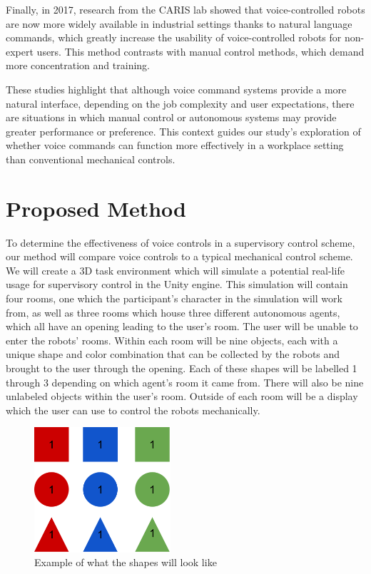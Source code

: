 \documentclass[conference]{IEEEtran}
\begin{document}
Finally, in 2017, research from the CARIS lab showed that voice-controlled robots are now more widely available in industrial settings thanks to natural language commands, which greatly increase the usability of voice-controlled robots for non-expert users. This method contrasts with manual control methods, which demand more concentration and training.  

These studies highlight that although voice command systems provide a more natural interface, depending on the job complexity and user expectations, there are situations in which manual control or autonomous systems may provide greater performance or preference. This context guides our study's exploration of whether voice commands can function more effectively in a workplace setting than conventional mechanical controls. 

\section{Proposed Method}
To determine the effectiveness of voice controls in a supervisory control scheme, our method will compare voice controls to a typical mechanical control scheme. We will create a 3D task environment which will simulate a potential real-life usage for supervisory control in the Unity engine. This simulation will contain four rooms, one which the participant’s character in the simulation will work from, as well as three rooms which house three different autonomous agents, which all have an opening leading to the user’s room. The user will be unable to enter the robots’ rooms. Within each room will be nine objects, each with a unique shape and color combination that can be collected by the robots and brought to the user through the opening. Each of these shapes will be labelled 1 through 3 depending on which agent’s room it came from. There will also be nine unlabeled objects within the user’s room. Outside of each room will be a display which the user can use to control the robots mechanically.

\begin{figure}[htbp]
\centerline{\includegraphics[width=0.45\textwidth]{sample_shapes_grid.png}}
\caption{Example of what the shapes will look like}
\label{sample_grid}
\end{figure}
\end{document}
